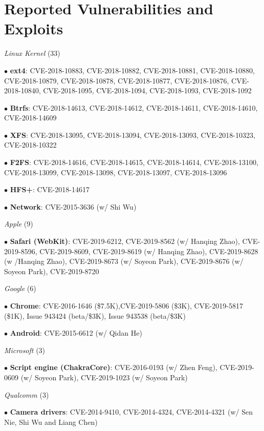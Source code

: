 \section*{Reported Vulnerabilities and Exploits}
\begin{description}
\item {\emph{Linux Kernel} (33)}
    \item $\bullet$ \textbf{ext4}: CVE-2018-10883, CVE-2018-10882, CVE-2018-10881, CVE-2018-10880, CVE-2018-10879, CVE-2018-10878, CVE-2018-10877, CVE-2018-10876, CVE-2018-10840, CVE-2018-1095, CVE-2018-1094, CVE-2018-1093, CVE-2018-1092
    \item $\bullet$ \textbf{Btrfs}: CVE-2018-14613, CVE-2018-14612, CVE-2018-14611, CVE-2018-14610, CVE-2018-14609
    \item $\bullet$ \textbf{XFS}: CVE-2018-13095, CVE-2018-13094, CVE-2018-13093, CVE-2018-10323, CVE-2018-10322
    \item $\bullet$ \textbf{F2FS}: CVE-2018-14616, CVE-2018-14615, CVE-2018-14614, CVE-2018-13100, CVE-2018-13099, CVE-2018-13098, CVE-2018-13097, CVE-2018-13096
	\item $\bullet$ \textbf{HFS+}: CVE-2018-14617
	\item $\bullet$ \textbf{Network}: CVE-2015-3636 (w/ Shi Wu)

\item {\emph{Apple} (9)}
\item $\bullet$ \textbf{Safari (WebKit)}: CVE-2019-6212,
CVE-2019-8562 (w/ Hanqing Zhao), CVE-2019-8596, CVE-2019-8609,
CVE-2019-8619 (w/ Hanqing Zhao), CVE-2019-8628 (w /Hanqing
Zhao), CVE-2019-8673 (w/ Soyeon Park), CVE-2019-8676 (w/ Soyeon
Park), CVE-2019-8720

\item {\emph{Google} (6)}
\item $\bullet$ \textbf{Chrome}: CVE-2016-1646 (\$7.5K),CVE-2019-5806 (\$3K), CVE-2019-5817 (\$1K), Issue 943424 (beta/\$3K), Issue 943538 (beta/\$3K)
    \item $\bullet$ \textbf{Android}: CVE-2015-6612 (w/ Qidan He)

\item {\emph{Microsoft} (3)}
	\item $\bullet$ \textbf{Script engine (ChakraCore)}: CVE-2016-0193 (w/ Zhen Feng), CVE-2019-0609 (w/ Soyeon Park), CVE-2019-1023 (w/ Soyeon Park)

\item {\emph{Qualcomm} (3)}
	\item $\bullet$ \textbf{Camera drivers}: CVE-2014-9410, CVE-2014-4324, CVE-2014-4321 (w/ Sen Nie, Shi Wu and Liang Chen)
\end{description}

